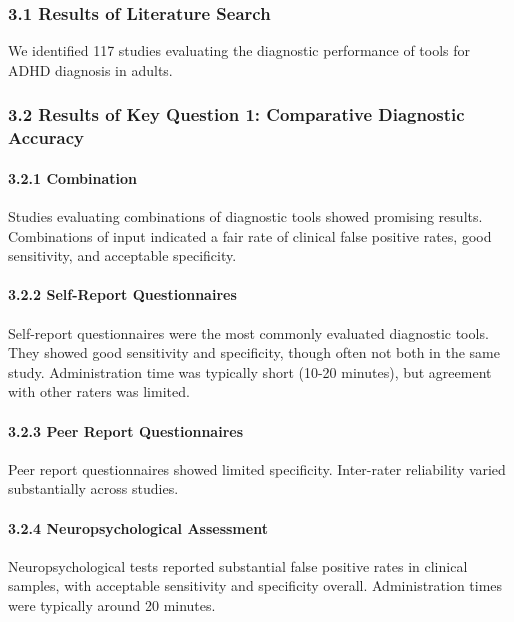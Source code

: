\documentclass[
  12pt,
  letterpaper,
]{article}
\renewcommand{\[}{\begin{singlespace}\oldDisplayMath}
\renewcommand{\]}{\endoldDisplayMath\end{singlespace}\vspace{\baselineskip}}
\begin{document}
\subsubsection{3.1 Results of Literature
Search}\label{results-of-literature-search}

We identified 117 studies evaluating the diagnostic performance of tools
for ADHD diagnosis in adults.

\subsubsection{3.2 Results of Key Question 1: Comparative Diagnostic
Accuracy}\label{results-of-key-question-1-comparative-diagnostic-accuracy}

\paragraph{3.2.1 Combination}\label{combination}

Studies evaluating combinations of diagnostic tools showed promising
results. Combinations of input indicated a fair rate of clinical false
positive rates, good sensitivity, and acceptable specificity.

\paragraph{3.2.2 Self-Report
Questionnaires}\label{self-report-questionnaires}

Self-report questionnaires were the most commonly evaluated diagnostic
tools. They showed good sensitivity and specificity, though often not
both in the same study. Administration time was typically short (10-20
minutes), but agreement with other raters was limited.

\paragraph{3.2.3 Peer Report
Questionnaires}\label{peer-report-questionnaires}

Peer report questionnaires showed limited specificity. Inter-rater
reliability varied substantially across studies.

\paragraph{3.2.4 Neuropsychological
Assessment}\label{neuropsychological-assessment}

Neuropsychological tests reported substantial false positive rates in
clinical samples, with acceptable sensitivity and specificity overall.
Administration times were typically around 20 minutes.
\end{document}
